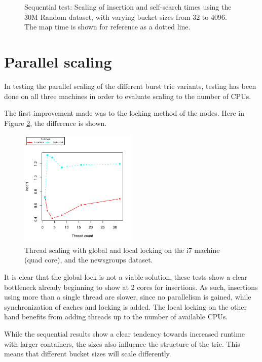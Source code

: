 \begin{landscape}
\begin{figure}[H]
{        }
        \caption{Sequential test: Scaling of insertion and self-search times
        using the 30M Random dataset, with varying bucket sizes from 32 to
        4096. The {\keyword map} time is shown for reference as a dotted line.}
        \label{fig:seq_30m}
    \end{figure}
\end{landscape}



\clearpage
\section{Parallel scaling}
In testing the parallel scaling of the different burst trie variants,
testing has been done on all three machines in order to evaluate scaling
to the number of CPUs.

The first improvement made was to the locking method of the nodes. Here in
Figure \ref{fig:globallock}, the difference is shown.
\begin{figure}[h!]
    \centering
    \includegraphics[width=0.5\textwidth]{plots/ts_locking}
    \caption{Thread scaling with global and local locking on the i7 machine (quad core),
    and the newsgroups dataset.}
    \label{fig:globallock}
\end{figure}
It is clear that the global lock is not a viable solution, these tests
show a clear bottleneck already beginning to show at 2 cores for insertions.
As such, insertions using more than a single thread are slower, since no
parallelism is gained, while synchronization of caches and locking is added.
The local locking on the other hand benefits from adding threads up to the
number of available CPUs.



While the sequential results show a clear tendency towards increased runtime
with larger containers, the sizes also influence the structure of the trie.
This means that different bucket sizes will scale differently.

